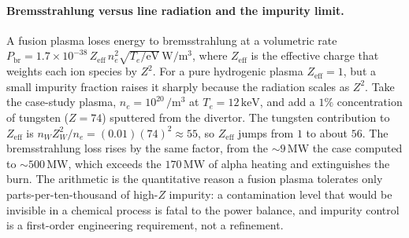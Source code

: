 \paragraph{Bremsstrahlung versus line radiation and the impurity limit.}
A fusion plasma loses energy to bremsstrahlung at a volumetric rate
$P_{\mathrm{br}} = 1.7\times 10^{-38}\,Z_{\mathrm{eff}}\,n_{e}^{2}\sqrt{T_{e}
/\text{eV}}\,\si{\watt\per\meter\cubed}$, where $Z_{\mathrm{eff}}$ is the
effective charge that weights each ion species by $Z^{2}$. For a pure
hydrogenic plasma $Z_{\mathrm{eff}} = 1$, but a small impurity fraction
raises it sharply because the radiation scales as $Z^{2}$. Take the
case-study plasma, $n_{e} = 10^{20}\,\si{\per\meter\cubed}$ at $T_{e} =
12\,\si{\kilo\electronvolt}$, and add a $1\%$ concentration of tungsten
($Z = 74$) sputtered from the divertor. The tungsten contribution to
$Z_{\mathrm{eff}}$ is $n_{W}Z_{W}^{2}/n_{e} = (0.01)(74)^{2} \approx 55$, so
$Z_{\mathrm{eff}}$ jumps from $1$ to about $56$. The bremsstrahlung loss
rises by the same factor, from the $\sim 9\,\si{\mega\watt}$ the case
computed to $\sim 500\,\si{\mega\watt}$, which exceeds the $170\,\si{\mega
\watt}$ of alpha heating and extinguishes the burn. The arithmetic is the
quantitative reason a fusion plasma tolerates only parts-per-ten-thousand of
high-$Z$ impurity: a contamination level that would be invisible in a
chemical process is fatal to the power balance, and impurity control is a
first-order engineering requirement, not a refinement.


